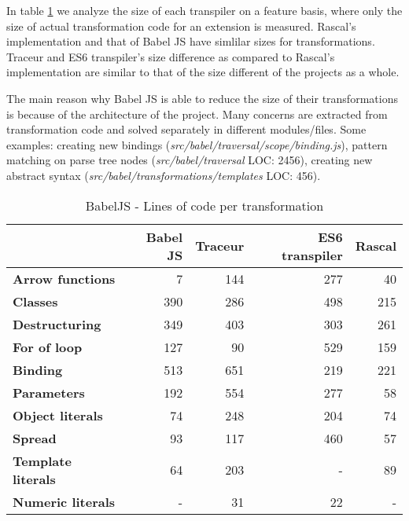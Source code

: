 In table \ref{tab:loc-feature} we analyze the size of each transpiler on a feature basis, where only the size of actual transformation code for an extension is measured. Rascal's implementation and that of Babel JS have simlilar sizes for transformations. Traceur and ES6 transpiler's size difference as compared to Rascal's implementation are similar to that of the size different of the projects as a whole. 

The main reason why Babel JS is able to reduce the size of their transformations is because of the architecture of the project. Many concerns are extracted from transformation code and solved separately in different modules/files. Some examples: creating new bindings (\textit{src/babel/traversal/scope/binding.js}), pattern matching on parse tree nodes (\textit{src/babel/traversal} LOC: 2456), creating new abstract syntax (\textit{src/babel/transformations/templates} LOC: 456). 

\begin{table}[h!]
\centering
\caption{BabelJS - Lines of code per transformation} \label{tab:loc-feature}
\begin{tabular}{@{}lrrrr@{}}
\toprule
                           & \textbf{Babel JS} & \textbf{Traceur} & \textbf{ES6 transpiler} & \textbf{Rascal} \\ \midrule
\textbf{Arrow functions}   & 7                 & 144              & 277\footnotemark[1]     & 40 \\
\textbf{Classes}           & 390               & 286              & 498                     & 215 \\
\textbf{Destructuring}     & 349               & 403              & 303                     & 261 \\
\textbf{For of loop}       & 127               & 90               & 529                     & 159 \\
\textbf{Binding}           & 513               & 651              & 219                     & 221 \\
\textbf{Parameters}        & 192               & 554              & 277\footnotemark[1]     & 58 \\
\textbf{Object literals}   & 74                & 248              & 204                     & 74 \\
\textbf{Spread}            & 93                & 117              & 460                     & 57 \\
\textbf{Template literals} & 64                & 203              & -\footnotemark          & 89 \\
\textbf{Numeric literals}  & -                 & 31               & 22                      & - \\ \bottomrule
\end{tabular}
\end{table}

